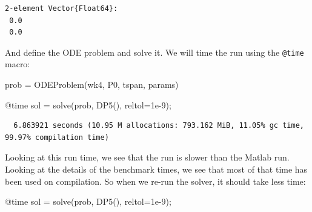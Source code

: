 \documentclass[
  a4paper,
  DIV=11,
  numbers=noendperiod,
  oneside]{scrreprt}
\newenvironment{Shaded}{\begin{snugshade}}{\end{snugshade}}
\newcommand{\FloatTok}[1]{\textcolor[rgb]{0.68,0.00,0.00}{#1}}
\newcommand{\FunctionTok}[1]{\textcolor[rgb]{0.28,0.35,0.67}{#1}}
\newcommand{\NormalTok}[1]{\textcolor[rgb]{0.00,0.23,0.31}{#1}}
\newcommand{\OperatorTok}[1]{\textcolor[rgb]{0.37,0.37,0.37}{#1}}
\newcommand{\PreprocessorTok}[1]{\textcolor[rgb]{0.68,0.00,0.00}{#1}}
\begin{document}
{
\makeatletter
\def\LT@makecaption#1#2#3{%
  \noalign{\smash{\hbox{\kern\textwidth\rlap{\kern\marginparsep
  \parbox[t]{\marginparwidth}{%
    \footnotesize{%
      \vspace{(1.1\baselineskip)}
    #1{#2: }\ignorespaces #3}}}}}}%
    }
\makeatother

\begin{verbatim}
2-element Vector{Float64}:
 0.0
 0.0
\end{verbatim}

}

And define the ODE problem and solve it. We will time the run using the \texttt{@time} macro:

\begin{Shaded}
\begin{Highlighting}[]
\NormalTok{prob }\OperatorTok{=} \FunctionTok{ODEProblem}\NormalTok{(wk4, P0, tspan, params)}

\PreprocessorTok{@time}\NormalTok{ sol }\OperatorTok{=} \FunctionTok{solve}\NormalTok{(prob, }\FunctionTok{DP5}\NormalTok{(), reltol}\OperatorTok{=}\FloatTok{1e{-}9}\NormalTok{);}
\end{Highlighting}
\end{Shaded}

\begin{verbatim}
  6.863921 seconds (10.95 M allocations: 793.162 MiB, 11.05% gc time, 99.97% compilation time)
\end{verbatim}

Looking at this run time, we see that the run is slower than the Matlab
run. Looking at the details of the
benchmark times, we see that most of that time has been used on
compilation. So when we re-run the solver, it should take less time:

\begin{Shaded}
\begin{Highlighting}[]
\PreprocessorTok{@time}\NormalTok{ sol }\OperatorTok{=} \FunctionTok{solve}\NormalTok{(prob, }\FunctionTok{DP5}\NormalTok{(), reltol}\OperatorTok{=}\FloatTok{1e{-}9}\NormalTok{);}
\end{Highlighting}
\end{Shaded}
\end{document}
